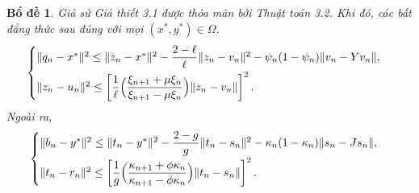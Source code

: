 \documentclass{MyBook}
\theoremstyle{plain}
\newtheorem{lemma}[theorem]{Bổ đề}
\theoremstyle{definition}
\theoremstyle{remark}
\numberwithin{equation}{chapter}
\newcommand{\nm}[1]{\lVert #1\rVert}
\begin{document}
\begin{lemma}\label{lem:4.3}
Giả sử Giả thiết 3.1 được thỏa mãn bởi Thuật toán 3.2. Khi đó, các bất đẳng thức sau đúng với mọi $(x^{*},y^{*})\in\Omega$.
\[
\begin{cases}
\nm{q_n-x^{*}}^2\le\nm{z_n-x^{*}}^2-\dfrac{2-\ell}{\ell}\nm{z_n-v_n}^2-\psi_n(1-\psi_n)\nm{v_n-Yv_n},\\[6pt]
\nm{z_n-u_n}^2\le\left[\dfrac{1}{\ell}\Bigl(\dfrac{\xi_{n+1}+\mu\xi_n}{\xi_{n+1}-\mu\xi_n}\Bigr)\nm{z_n-v_n}\right]^2.
\end{cases}
\]
Ngoài ra,
\[
\begin{cases}
\nm{b_n-y^{*}}^2\le\nm{t_n-y^{*}}^2-\dfrac{2-g}{g}\nm{t_n-s_n}^2-\kappa_n(1-\kappa_n)\nm{s_n-Js_n},\\[6pt]
\nm{t_n-r_n}^2\le\left[\dfrac{1}{g}\Bigl(\dfrac{\kappa_{n+1}+\phi\kappa_n}{\kappa_{n+1}-\phi\kappa_n}\Bigr)\nm{t_n-s_n}\right]^2.
\end{cases}
\]
\end{lemma}
\end{document}
